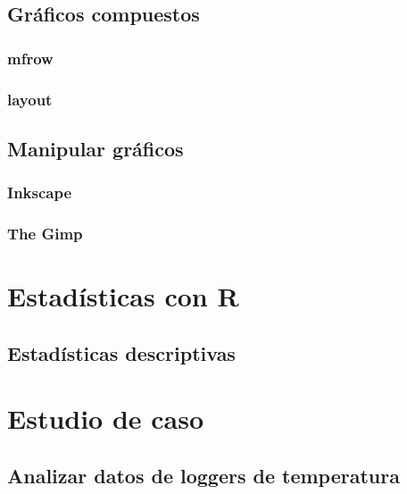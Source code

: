 \documentclass[]{book}
\begin{document}
\chapter{Gráficos compuestos}\label{graph3}

\section{mfrow}\label{mfrow}

\section{layout}\label{layout}

\chapter{Manipular gráficos}\label{graph4}

\section{Inkscape}\label{inkscape}

\section{The Gimp}\label{the-gimp}

\part{Estadísticas con R}\label{part-estadisticas-con-r}

\chapter{Estadísticas descriptivas}\label{stats1}

\part{Estudio de caso}\label{part-estudio-de-caso}

\chapter{Analizar datos de loggers de temperatura}\label{studyCase1}
\end{document}
